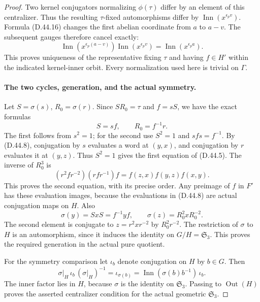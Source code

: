 \begin{proof}
Two kernel conjugators
normalizing \(\phi(\tau)\)
differ by an element of
this centralizer.
Thus the resulting
\(\tau\)-fixed automorphisms
differ by
\(\operatorname{Inn}(x^{\epsilon_p v})\).
Formula \textup{(D.44.16)}
changes the first abelian
coordinate from \(a\) to \(a-v\).
The subsequent gauges
therefore cancel exactly:
\[
 \operatorname{Inn}(x^{\epsilon_p(a-v)})
 \operatorname{Inn}(x^{\epsilon_p v})
       =\operatorname{Inn}(x^{\epsilon_p a}).
 \tag{D.44.18}
\]
This proves uniqueness of
the representative fixing
\(\tau\) and having \(f\in H'\)
within the indicated kernel-inner
orbit.
Every normalization used here
is trivial on \(\Gamma\).

\paragraph{The two cycles, generation, and the actual symmetry.}
Let \(S=\sigma(s)\), \(R_0=\sigma(r)\).
Since \(S R_0=\tau\) and
\(f=sS\), we have the exact
formulas
\[
                  S=s f,\qquad R_0=f^{-1}r .
 \tag{D.44.19}
\]
The first follows from \(s^2=1\);
for the second use \(S^2=1\)
and \(sfs=f^{-1}\).
By \textup{(D.44.8)}, conjugation
by \(s\) evaluates a word
at \((y,x)\), and conjugation
by \(r\) evaluates it at
\((y,z)\).
Thus \(S^2=1\) gives the
first equation of
\textup{(D.44.5)}.
The inverse of \(R_0^3\) is
\[
       (r^2 f r^{-2})(r f r^{-1})f
              =f(z,x)f(y,z)f(x,y).
 \tag{D.44.20}
\]
This proves the second equation,
with its precise order.
Any preimage of \(f\) in \(F'\)
has these evaluation images,
because the evaluations in
\textup{(D.44.8)} are actual
conjugation maps on \(H\).
Also
\[
      \sigma(y)=SxS=f^{-1}yf,\qquad
      \sigma(z)=R_0^2 x R_0^{-2}.
 \tag{D.44.21}
\]
The second element is conjugate
to \(z=r^2xr^{-2}\) by
\(R_0^2r^{-2}\).
The restriction of \(\sigma\)
to \(H\) is an automorphism,
since it induces the identity
on \(G/H=\mathfrak S_3\).
This proves the required
generation in the actual
pure quotient.

For the symmetry comparison
let \(\iota_b\) denote
conjugation on \(H\) by
\(b\in G\).
Then
\[
 \sigma|_H\,\iota_b\,(\sigma|_H)^{-1}
       =\iota_{\sigma(b)}
       =\operatorname{Inn}(\sigma(b)b^{-1})\,\iota_b.
 \tag{D.44.22}
\]
The inner factor lies in \(H\),
because \(\sigma\) is the
identity on \(\mathfrak S_3\).
Passing to \(\operatorname{Out}(H)\)
proves the asserted centralizer
condition for the actual
geometric \(\mathfrak S_3\).


\end{proof}
